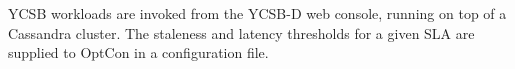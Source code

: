 \documentclass[conference]{IEEEtran}
\begin{document}
   YCSB workloads are invoked from the YCSB-D web console, running on top of a Cassandra cluster. %
   The staleness and latency thresholds for a given SLA are supplied to OptCon in a configuration file.
\end{document}
